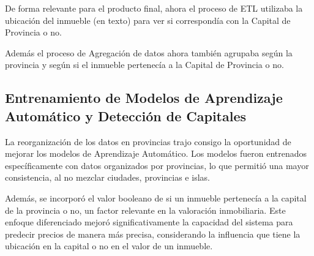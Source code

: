 De forma relevante para el producto final, ahora el proceso de ETL utilizaba la ubicación del inmueble (en texto) para ver si correspondía con la Capital de Provincia o no.

Además el proceso de Agregación de datos ahora también agrupaba según la provincia y según si el inmueble pertenecía a la Capital de Provincia o no.

\subsection{Entrenamiento de Modelos de Aprendizaje Automático y Detección de Capitales}

La reorganización de los datos en provincias trajo consigo la oportunidad de mejorar los modelos de Aprendizaje Automático. Los modelos fueron entrenados específicamente con datos organizados por provincias, lo que permitió una mayor consistencia, al no mezclar ciudades, provincias e islas. 

Además, se incorporó el valor booleano de si un inmueble pertenecía a la capital de la provincia o no, un factor relevante en la valoración inmobiliaria. Este enfoque diferenciado mejoró significativamente la capacidad del sistema para predecir precios de manera más precisa, considerando la influencia que tiene la ubicación en la capital o no en el valor de un inmueble.

